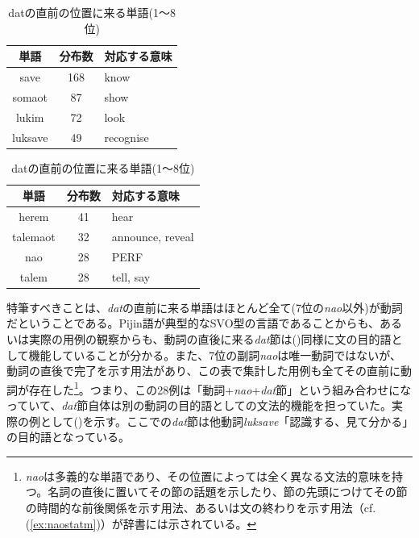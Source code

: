 \begin{table}[h]
  \caption{datの直前の位置に来る単語(1～8位)}
  \label{tb:datl1}
  \begin{minipage}{0.5\hsize}
  \begin{center}
    \begin{tabular}{|c||c|l|} \hline
      単語 & 分布数 & 対応する意味 \\ \hline \hline
      save & 168 & know\\ \hline
      somaot & 87 & show\\ \hline
      lukim & 72 & look\\ \hline
      luksave & 49 & recognise\\ \hline
    \end{tabular}
  \end{center}
  \end{minipage}
  \begin{minipage}{0.5\hsize}
    \begin{center}
      \begin{tabular}{|c||c|l|} \hline
        単語 & 分布数 & 対応する意味 \\ \hline \hline
        herem & 41 & hear \\ \hline
        talemaot & 32 & announce, reveal\\ \hline
        nao & 28 & PERF\\ \hline
        talem & 28 & tell, say\\ \hline
      \end{tabular}
    \end{center}
  \end{minipage}
\end{table}

特筆すべきことは、\textit{dat}の直前に来る単語はほとんど全て(7位の\textit{nao}以外)が動詞だということである。Pijin語が典型的なSVO型の言語であることからも、あるいは実際の用例の観察からも、動詞の直後に来る\textit{dat}節は()同様に文の目的語として機能していることが分かる。また、7位の副詞\textit{nao}は唯一動詞ではないが、動詞の直後で完了を示す用法があり、この表で集計した用例も全てその直前に動詞が存在した\footnote{
\textit{nao}は多義的な単語であり、その位置によっては全く異なる文法的意味を持つ。名詞の直後に置いてその節の話題を示したり、節の先頭につけてその節の時間的な前後関係を示す用法、あるいは文の終わりを示す用法（cf.(\ref{ex:naostatm})）が辞書\citep[145]{dictionary}には示されている。}。つまり、この28例は「動詞+\textit{nao}+\textit{dat}節」という組み合わせになっていて、\textit{dat}節自体は別の動詞の目的語としての文法的機能を担っていた。実際の例として()を示す。ここでの\textit{dat}節は他動詞\textit{luksave}「認識する、見て分かる」の目的語となっている。

